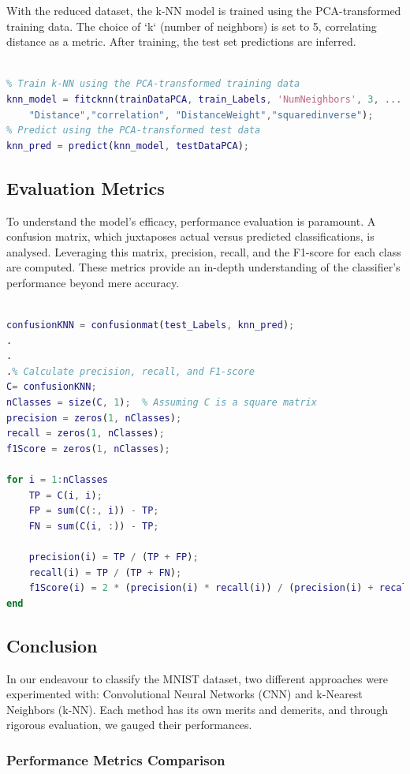 With the reduced dataset, the k-NN model is trained using the PCA-transformed training data. The choice of `k` (number of neighbors) is set to 5, correlating distance as a metric. After training, the test set predictions are inferred.
\begin{lstlisting}[language=Matlab]

% Train k-NN using the PCA-transformed training data
knn_model = fitcknn(trainDataPCA, train_Labels, 'NumNeighbors', 3, ...
    "Distance","correlation", "DistanceWeight","squaredinverse");
% Predict using the PCA-transformed test data
knn_pred = predict(knn_model, testDataPCA);
\end{lstlisting}
\subsection{Evaluation Metrics}

To understand the model's efficacy, performance evaluation is paramount. A confusion matrix, which juxtaposes actual versus predicted classifications, is analysed. Leveraging this matrix, precision, recall, and the F1-score for each class are computed. These metrics provide an in-depth understanding of the classifier's performance beyond mere accuracy.
\begin{lstlisting}[language=Matlab]

confusionKNN = confusionmat(test_Labels, knn_pred);
.
.
.% Calculate precision, recall, and F1-score
C= confusionKNN;
nClasses = size(C, 1);  % Assuming C is a square matrix
precision = zeros(1, nClasses);
recall = zeros(1, nClasses);
f1Score = zeros(1, nClasses);

for i = 1:nClasses
    TP = C(i, i);
    FP = sum(C(:, i)) - TP;
    FN = sum(C(i, :)) - TP;
    
    precision(i) = TP / (TP + FP);
    recall(i) = TP / (TP + FN);
    f1Score(i) = 2 * (precision(i) * recall(i)) / (precision(i) + recall(i));
end
\end{lstlisting}
\subsection{Conclusion}

In our endeavour to classify the MNIST dataset, two different approaches were experimented with: Convolutional Neural Networks (CNN) and k-Nearest Neighbors (k-NN). Each method has its own merits and demerits, and through rigorous evaluation, we gauged their performances.

\subsubsection{Performance Metrics Comparison}


